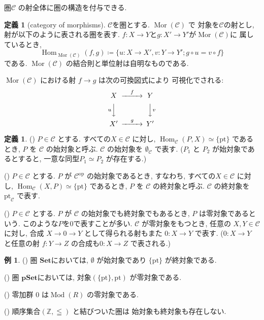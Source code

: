 \documentclass[a5paper, dvipdfmx]{jsbook}
\theoremstyle{definition}
\newtheorem{Definition}[Axiom]{定義}
\newtheorem{Example}[Axiom]{例}
\newcommand{\Z}{\mathbb{Z}}
\newcommand{\mcal}{\mathcal}
\numberwithin{equation}{section} %
\newcommand{\Hom}{\mathop{\mathrm{Hom}}\nolimits}
\newcommand{\Mod}{\mathop{\mathrm{Mod}}\nolimits}
\newcommand{\Mor}{\mathop{\mathrm{Mor}}\nolimits}
\def\rnum#1{\expandafter{\romannumeral #1}}
\begin{document}
圏$\mcal{C}$ の射全体に圏の構造を付与できる. 

\begin{Definition}[category of morphisms]
  $\mcal{C}$を圏とする. $\Mor(\mcal{C})$ で
  対象を$\mcal{C}$の射とし, 射が以下のように表される圏を表す. 
  $f:X\to Y$と$g:X'\to Y'$が$\Mor(\mcal{C})$に
  属しているとき, 
  \[
    \Hom_{\Mor(\mcal{C})}(f,g) 
    \coloneqq 
    \{u:X\to X', v:Y\to Y' ; g\circ u = v \circ f\}
  \]
  である. $\Mor(\mcal{C})$ の結合則と単位射は自明なものである. 
\end{Definition}

$\Mor(\mcal{C})$ における射 $f \to g$ は次の可換図式により
可視化でされる: 
\[
  \begin{CD}
     X    @>{f}>>  Y \\
  @V{u}VV       @VV{v}V \\
     X'   @>{g}>>  Y'
  \end{CD}
\]

\begin{Definition}
  (\rnum{1}) 
  $P \in \mcal{C}$ とする. 
  すべての$X \in \mcal{C}$ に対し, 
  $\Hom_{\mcal{C}}(P, X) \simeq \{\mathrm{pt}\}$ 
  であるとき, $P$ を $\mcal{C}$ の始対象と呼ぶ. 
  $\mcal{C}$ の始対象を ${\emptyset}_{\mcal{C}}$ で表す. 
  ($P_1$ と $P_2$ が始対象であるとすると, 
  一意な同型$P_1 \simeq P_2$ が存在する.)

  (\rnum{2})
  $P \in \mcal{C}$ とする. 
  $P$ が ${\mcal{C}}^{\mathrm{op}}$ の始対象であるとき, 
  すなわち, 
  すべての$X \in \mcal{C}$ に対し, 
  $\Hom_{\mcal{C}}(X,P) \simeq \{\mathrm{pt}\}$ 
  であるとき, $P$ を $\mcal{C}$ の終対象と呼ぶ. 
  $\mcal{C}$ の終対象を ${\mathrm{pt}}_{\mcal{C}}$ で表す. 
  
  (\rnum{3})
  $P \in \mcal{C}$ とする. 
  $P$ が $\mcal{C}$ の始対象でも終対象でもあるとき, 
  $P$ は零対象であるという. 
  このような$P$を$0$で表すことが多い. 
  $\mcal{C}$ が零対象をもつとき, 
  任意の $X,Y\in \mcal{C}$ に対し, 
  合成 $X \to 0 \to Y$ として得られる射もまた
  $0: X \to Y$ で表す. 
  ($0: X \to Y$ と任意の射 $f: Y \to Z$ 
  の合成も$0: X \to Z$ で表される.)
\end{Definition}

\begin{Example}
  (\rnum{1})
  圏 $\mathbf{Set}$においては, $\emptyset$ が始対象であり
  $\{\mathrm{pt}\}$ が終対象である. 

  (\rnum{2}) 
  圏 $\mathbf{pSet}$においては, 
  対象$(\{\mathrm{pt}\}, \mathrm{pt})$ 
  が零対象である. 

  (\rnum{3}) 
  零加群 $0$ は$\Mod (R)$ の零対象である. 

  (\rnum{4}) 
  順序集合$({\Z}, \leqq)$ と結びついた圏は
  始対象も終対象も存在しない. 
\end{Example}
\end{document}
